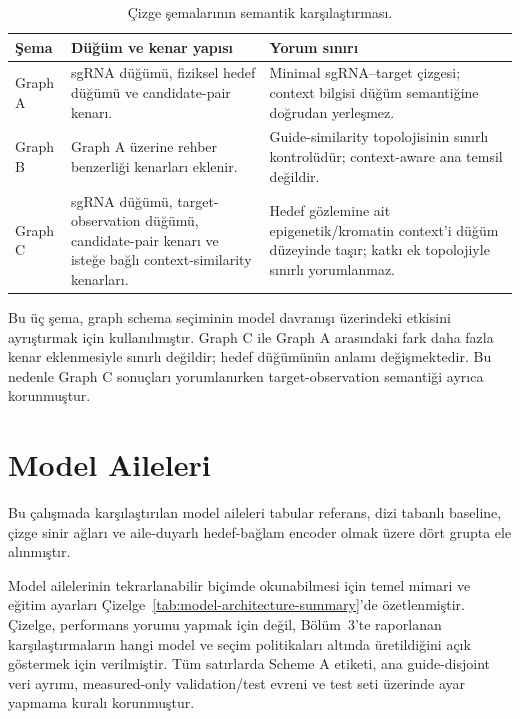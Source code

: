 \begin{table}[htbp]
\caption{Çizge şemalarının semantik karşılaştırması.}
\label{tab:graph-schemas}
\centering
\small
\begin{tabularx}{\textwidth}{l >{\raggedright\arraybackslash}X >{\raggedright\arraybackslash}X}
\toprule\toprule
Şema & Düğüm ve kenar yapısı & Yorum sınırı\\
\midrule
Graph A & sgRNA düğümü, fiziksel hedef düğümü ve candidate-pair kenarı. & Minimal sgRNA--target çizgesi; context bilgisi düğüm semantiğine doğrudan yerleşmez.\\
Graph B & Graph A üzerine rehber benzerliği kenarları eklenir. & Guide-similarity topolojisinin sınırlı kontrolüdür; context-aware ana temsil değildir.\\
Graph C & sgRNA düğümü, target-observation düğümü, candidate-pair kenarı ve isteğe bağlı context-similarity kenarları. & Hedef gözlemine ait epigenetik/kromatin context'i düğüm düzeyinde taşır; katkı ek topolojiyle sınırlı yorumlanmaz.\\
\bottomrule
\end{tabularx}
\end{table}

Bu üç şema, graph schema seçiminin model davranışı üzerindeki etkisini ayrıştırmak için kullanılmıştır. Graph C ile Graph A arasındaki fark daha fazla kenar eklenmesiyle sınırlı değildir; hedef düğümünün anlamı değişmektedir. Bu nedenle Graph C sonuçları yorumlanırken target-observation semantiği ayrıca korunmuştur.

\section{Model Aileleri}

Bu çalışmada karşılaştırılan model aileleri tabular referans, dizi tabanlı baseline, çizge sinir ağları ve aile-duyarlı hedef-bağlam encoder olmak üzere dört grupta ele alınmıştır.

Model ailelerinin tekrarlanabilir biçimde okunabilmesi için temel mimari ve eğitim ayarları Çizelge~\ref{tab:model-architecture-summary}'de özetlenmiştir. Çizelge, performans yorumu yapmak için değil, Bölüm~3'te raporlanan karşılaştırmaların hangi model ve seçim politikaları altında üretildiğini açık göstermek için verilmiştir. Tüm satırlarda Scheme A etiketi, ana guide-disjoint veri ayrımı, measured-only validation/test evreni ve test seti üzerinde ayar yapmama kuralı korunmuştur.

